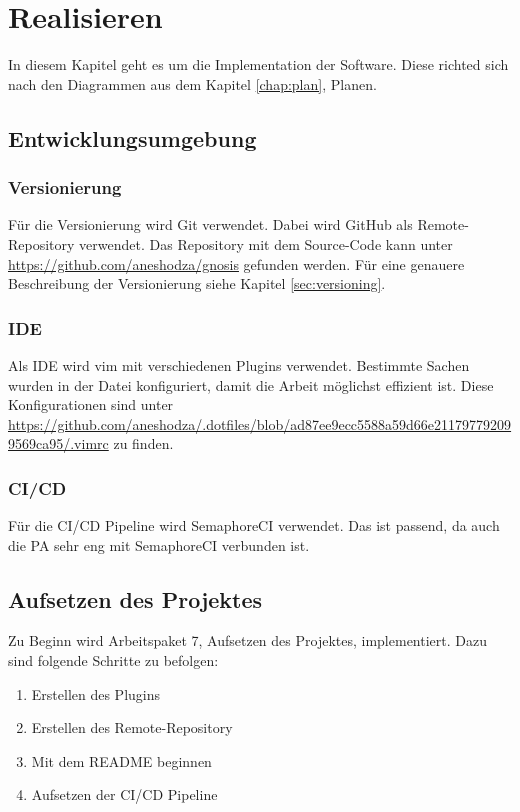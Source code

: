 \chapter{Realisieren}
In diesem Kapitel geht es um die Implementation der Software. Diese richted sich nach den Diagrammen aus dem Kapitel
\ref{chap:plan}, Planen.

\section{Entwicklungsumgebung}
\subsection{Versionierung}
Für die Versionierung wird Git verwendet. Dabei wird GitHub als Remote-Repository verwendet. Das Repository mit
dem Source-Code kann unter \url{https://github.com/aneshodza/gnosis} gefunden werden. Für eine genauere Beschreibung
der Versionierung siehe Kapitel \ref{sec:versioning}.
\subsection{IDE}
Als IDE wird vim mit verschiedenen Plugins verwendet. Bestimmte Sachen wurden in der  Datei
konfiguriert, damit die Arbeit möglichst effizient ist. \newline
Diese Konfigurationen sind unter \newline
\url{https://github.com/aneshodza/.dotfiles/blob/ad87ee9ecc5588a59d66e211797792099569ca95/.vimrc} zu finden.
\subsection{CI/CD}
Für die CI/CD Pipeline wird SemaphoreCI verwendet. Das ist passend, da auch die PA sehr eng mit SemaphoreCI verbunden
ist.

\section{Aufsetzen des Projektes}
Zu Beginn wird Arbeitspaket 7, Aufsetzen des Projektes, implementiert. Dazu sind folgende Schritte zu befolgen:
\begin{enumerate}
  \item Erstellen des Plugins
  \item Erstellen des Remote-Repository
  \item Mit dem README beginnen
  \item Aufsetzen der CI/CD Pipeline
\end{enumerate}

